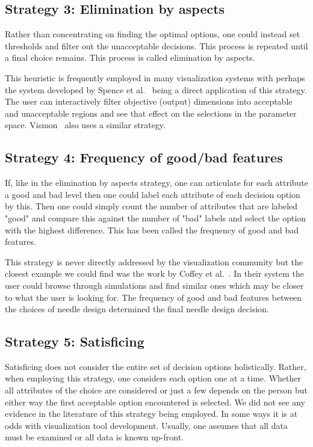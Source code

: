 \subsection{Strategy 3: Elimination by aspects}\label{elimination-by-aspects}

Rather than concentrating on finding the optimal options, one could
instead set thresholds and filter out the unacceptable decisions. This process
is repeated until a final choice remains. This process is called
elimination by aspects.

This heuristic is frequently employed in many visualization systems with
perhaps the system developed by Spence et al.~\citep{Spence:1995} being a
direct application of this strategy. The user can interactively filter
objective (output) dimensions into acceptable and unacceptable regions and
see that effect on the selections in the parameter space. 
Vismon~\citep{Booshehrian:2012} also uses a similar strategy.

\subsection{Strategy 4: Frequency of good/bad features}
\label{frequency-of-goodbad-features}

If, like in the elimination by aspects strategy, one can articulate for
each attribute a good and bad level then one could label each attribute
of each decision option by this. Then one could simply count the number of
attributes that are labeled "good" and compare this against the number of
"bad" labels and select the option with the highest difference. This has
been called the frequency of good and bad features.

This strategy is never directly addressed by the visualization community
but the closest example we could find was the work by 
Coffey et al.~\citep{Coffey:2013}. In their system the user could browse
through simulations and find similar ones which may be closer to what
the user is looking for. The frequency of good and bad features between the
choices of needle design determined the final needle design decision.

\subsection{Strategy 5: Satisficing}\label{satisficing}

Satisficing does not consider the entire set of decision options holistically.
Rather, when employing this strategy, one considers each option one at a time.
Whether all attributes of the choice are considered or just a few depends on
the person but either way the first acceptable option encountered is selected.
We did not see any evidence in the literature of this strategy being
employed. In some ways it is at odds with visualization tool development.
Usually, one assumes that all data must be examined or all data is known
up-front.


